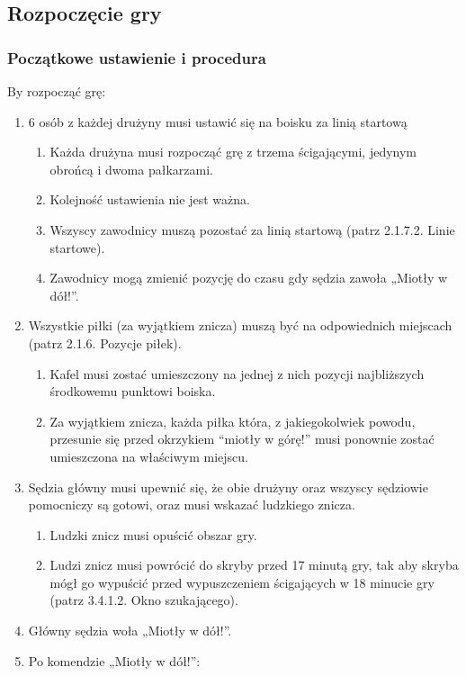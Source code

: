 \documentclass[12pt]{article}
\begin{document}
\subsection{Rozpoczęcie gry}

\subsubsection{Początkowe ustawienie i procedura}
By rozpocząć grę:

\begin{enumerate}
\item
    6 osób z każdej drużyny musi ustawić się na boisku za linią startową
  
  \begin{enumerate}
  \item
        Każda drużyna musi rozpocząć grę z trzema ścigającymi, jedynym
    obrońcą i dwoma pałkarzami.
      \item
        Kolejność ustawienia nie jest ważna.
      \item
        Wszyscy zawodnicy muszą pozostać za linią startową (patrz 2.1.7.2.
    Linie startowe).
      \item
        Zawodnicy mogą zmienić pozycję do czasu gdy sędzia zawoła „Miotły w
    dół!''.
      \end{enumerate}
\item
    Wszystkie piłki (za wyjątkiem znicza) muszą być na odpowiednich
  miejscach (patrz 2.1.6. Pozycje piłek).
  
  \begin{enumerate}
  \item
        Kafel musi zostać umieszczony na jednej z nich pozycji najbliższych
    środkowemu punktowi boiska.
      \item
        Za wyjątkiem znicza, każda piłka która, z jakiegokolwiek powodu,
    przesunie się przed okrzykiem ``miotły w górę!'' musi ponownie
    zostać umieszczona na właściwym miejscu.
      \end{enumerate}
\item
    Sędzia główny musi upewnić się, że obie drużyny oraz wszyscy sędziowie
  pomocniczy są gotowi, oraz musi wskazać ludzkiego znicza.
  
  \begin{enumerate}
  \item
        Ludzki znicz musi opuścić obszar gry.
      \item
        Ludzi znicz musi powrócić do skryby przed 17 minutą gry, tak aby
    skryba mógł go wypuścić przed wypuszczeniem ścigających w 18 minucie
    gry (patrz 3.4.1.2. Okno szukającego).
      \end{enumerate}
\item
    Główny sędzia woła „Miotły w dół!''.
  \item
    Po komendzie „Miotły w dół!'':
  

\end{enumerate}
\end{document}
